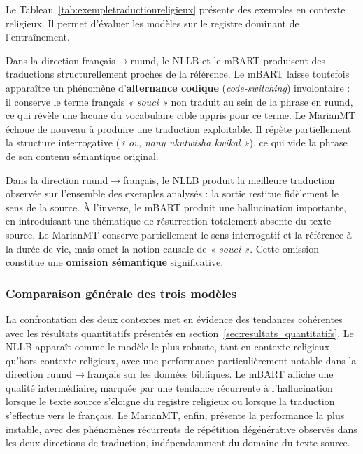 Le Tableau~\ref{tab:exempletraductionreligieux} présente des exemples en contexte religieux. Il permet d'évaluer les modèles sur le registre dominant de l'entraînement.

Dans la direction français$\rightarrow$ruund, le \ac{NLLB} et le \ac{mBART} produisent des traductions structurellement proches de la référence. Le \ac{mBART} laisse toutefois apparaître un phénomène d'\textbf{alternance codique} (\textit{code-switching}) involontaire : il conserve le terme français \textit{« souci »} non traduit au sein de la phrase en ruund, ce qui révèle une lacune du vocabulaire cible appris pour ce terme. Le \ac{MarianMT} échoue de nouveau à produire une traduction exploitable. Il répète partiellement la structure interrogative (\textit{« ov, nany ukutwisha kwikal »}), ce qui vide la phrase de son contenu sémantique original.

Dans la direction ruund$\rightarrow$français, le \ac{NLLB} produit la meilleure traduction observée sur l'ensemble des exemples analysés : la sortie restitue fidèlement le sens de la source. À l'inverse, le \ac{mBART} produit une hallucination importante, en introduisant une thématique de résurrection totalement absente du texte source. Le \ac{MarianMT} conserve partiellement le sens interrogatif et la référence à la durée de vie, mais omet la notion causale de \textit{« souci »}. Cette omission constitue une \textbf{omission sémantique} significative.

\subsubsection{Comparaison générale des trois modèles}

La confrontation des deux contextes met en évidence des tendances cohérentes avec les résultats quantitatifs présentés en section~\ref{sec:resultats_quantitatifs}. Le \ac{NLLB} apparaît comme le modèle le plus robuste, tant en contexte religieux qu'hors contexte religieux, avec une performance particulièrement notable dans la direction ruund$\rightarrow$français sur les données bibliques. Le \ac{mBART} affiche une qualité intermédiaire, marquée par une tendance récurrente à l'hallucination lorsque le texte source s'éloigne du registre religieux ou lorsque la traduction s'effectue vers le français. Le \ac{MarianMT}, enfin, présente la performance la plus instable, avec des phénomènes récurrents de répétition dégénérative observés dans les deux directions de traduction, indépendamment du domaine du texte source.

